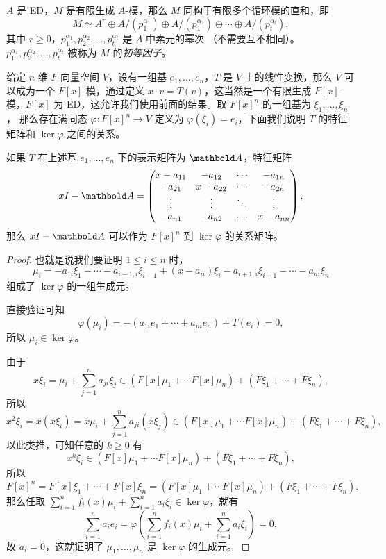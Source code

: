 \begin{theorem}
  $A$ 是 ED，$M$ 是有限生成 $A$-模，那么 $M$ 同构于有限多个循环模的直和，即
  \[
    M\simeq A^r\oplus A/(p_1^{\alpha_1})\oplus A/(p_1^{\alpha_2})\oplus\cdots  \oplus A/(p_t^{\alpha_t}),
  \]
  其中 $r\geq 0$，$p_1^{\alpha_1},p_2^{\alpha_2},\dots,p_t^{\alpha_t}$ 是 $A$ 中素元的幂次
  （不需要互不相同）。 $p_1^{\alpha_1},p_2^{\alpha_2},\dots,p_t^{\alpha_t}$
  被称为 $M$ 的\emph{初等因子}。
\end{theorem}

给定 $n$ 维 $F$-向量空间 $V$，设有一组基 $e_1,\dots,e_n$，$T$ 是 $V$ 上的线性变换，那么 $V$ 可以成为一个
$F[x]$-模，通过定义 $x\cdot v=T(v)$，这当然是一个有限生成 $F[x]$-模，$F[x]$
为 ED，这允许我们使用前面的结果。取 $F[x]^n$ 的一组基为 $\xi_1,\dots,\xi_n$，
那么存在满同态 $\varphi:F[x]^n\to V$ 定义为 $\varphi(\xi_i)=e_i$，下面我们说明
$T$ 的特征矩阵和 $\ker\varphi$ 之间的关系。

\begin{proposition}
  如果 $T$ 在上述基 $e_1,\dots,e_n$ 下的表示矩阵为 $\mat A$，特征矩阵
  \[
    xI-\mat A=
    \begin{pmatrix}
      x-a_{11} & -a_{12} & \cdots & -a_{1n}\\
      -a_{21} & x-a_{22} & \cdots & -a_{2n}\\
      \vdots & \vdots & \ddots & \vdots \\
      -a_{n1} & -a_{n2} & \cdots & x-a_{nn}
    \end{pmatrix}  ,
  \]
  那么 $xI-\mat A$ 可以作为 $F[x]^n$ 到 $\ker\varphi$ 的关系矩阵。
\end{proposition}
\begin{proof}
  也就是说我们要证明 $1\leq i\leq n$ 时，
  \[
    \mu_i=-a_{1i}\xi_1-\cdots-a_{i-1,i}\xi_{i-1}+(x-a_{ii})\xi_i-a_{i+1,i}\xi_{i+1}
    -\cdots-a_{ni}\xi_n  
  \]
  组成了 $\ker\varphi$ 的一组生成元。

  直接验证可知
  \[
    \varphi(\mu_i)=-(a_{1i}e_1+\cdots+a_{ni}e_n)+T(e_i)=0,  
  \]
  所以 $\mu_i\in\ker\varphi$。

  由于 
  \[
    x\xi_i=\mu_i+\sum_{j=1}^na_{ji}\xi_j\in 
    (F[x]\mu_1+\cdots F[x]\mu_n)+(F\xi_1+\cdots+F\xi_n),
  \]
  所以
  \[
    x^2\xi_i=x(x\xi_i)=  x\mu_i+\sum_{j=1}^na_{ji}(x\xi_j)
    \in (F[x]\mu_1+\cdots F[x]\mu_n)+(F\xi_1+\cdots+F\xi_n),
  \]
  以此类推，可知任意的 $k\geq 0$ 有
  \[
    x^k\xi_i\in   (F[x]\mu_1+\cdots F[x]\mu_n)+(F\xi_1+\cdots+F\xi_n),
  \]
  所以
  \[
    F[x]^n=F[x]\xi_1+\cdots+F[x]\xi_n=   (F[x]\mu_1+\cdots F[x]\mu_n)+(F\xi_1+\cdots+F\xi_n).
  \]
  那么任取 $\sum_{i=1}^nf_i(x)\mu_i+\sum_{i=1}^n a_i\xi_i\in \ker\varphi$，就有
  \[
    \sum_{i=1}^n a_ie_i=\varphi\left(\sum_{i=1}^nf_i(x)\mu_i+\sum_{i=1}^n a_i\xi_i\right) =0,
  \]
  故 $a_i=0$，这就证明了 $\mu_1,\dots,\mu_n$ 是 $\ker\varphi$ 的生成元。
\end{proof}


